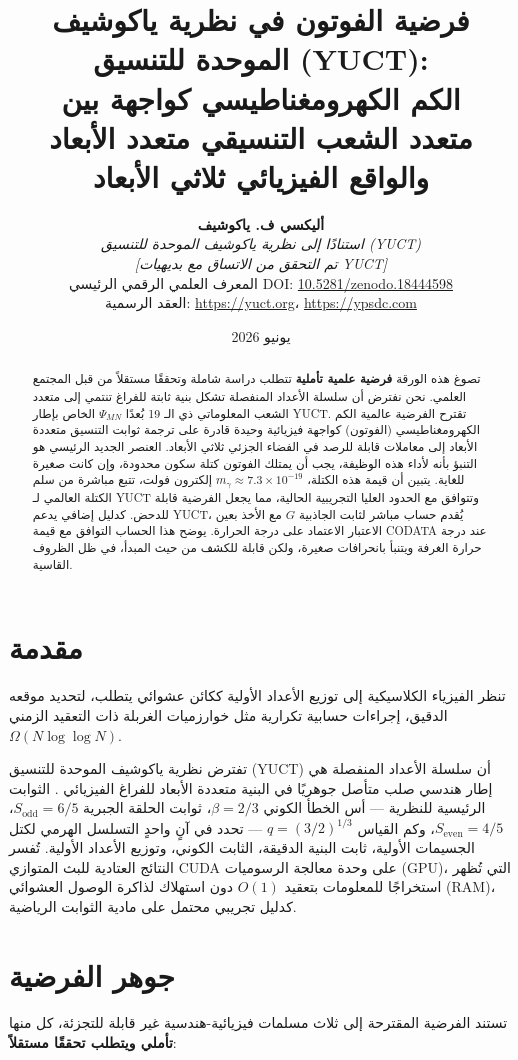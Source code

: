 \documentclass[11pt,a4paper]{article}
\title{\textbf{فرضية الفوتون في نظرية ياكوشيف الموحدة للتنسيق (YUCT):\\
		الكم الكهرومغناطيسي كواجهة بين\\
		متعدد الشعب التنسيقي متعدد الأبعاد والواقع الفيزيائي ثلاثي الأبعاد}}
\author{\textbf{أليكسي ف. ياكوشيف} \\
	\small\textit{استنادًا إلى نظرية ياكوشيف الموحدة للتنسيق (YUCT)} \\
	\small\textit{[تم التحقق من الاتساق مع بديهيات YUCT]} \\
	\small المعرف العلمي الرقمي الرئيسي DOI: \href{https://doi.org/10.5281/zenodo.18444598}{10.5281/zenodo.18444598} \\
	\small العقد الرسمية: \url{https://yuct.org}، \url{https://ypsdc.com}}
\date{يونيو 2026}
\begin{document}
	
	\maketitle
	
	\begin{abstract}
		تصوغ هذه الورقة \textbf{فرضية علمية تأملية} تتطلب دراسة شاملة وتحققًا مستقلاً من قبل المجتمع العلمي. نحن نفترض أن سلسلة الأعداد المنفصلة تشكل بنية ثابتة للفراغ تنتمي إلى متعدد الشعب المعلوماتي ذي الـ 19 بُعدًا $\Psi_{MN}$ الخاص بإطار YUCT. تقترح الفرضية عالمية الكم الكهرومغناطيسي (الفوتون) كواجهة فيزيائية وحيدة قادرة على ترجمة ثوابت التنسيق متعددة الأبعاد إلى معاملات قابلة للرصد في الفضاء الجزئي ثلاثي الأبعاد. العنصر الجديد الرئيسي هو التنبؤ بأنه لأداء هذه الوظيفة، يجب أن يمتلك الفوتون كتلة سكون محدودة، وإن كانت صغيرة للغاية. يتبين أن قيمة هذه الكتلة، $m_\gamma \approx 7.3 \times 10^{-19}$ إلكترون فولت، تتبع مباشرة من سلم الكتلة العالمي لـ YUCT وتتوافق مع الحدود العليا التجريبية الحالية، مما يجعل الفرضية قابلة للدحض. كدليل إضافي يدعم YUCT، يُقدم حساب مباشر لثابت الجاذبية $G$ مع الأخذ بعين الاعتبار الاعتماد على درجة الحرارة. يوضح هذا الحساب التوافق مع قيمة CODATA عند درجة حرارة الغرفة ويتنبأ بانحرافات صغيرة، ولكن قابلة للكشف من حيث المبدأ، في ظل الظروف القاسية.
	\end{abstract}
	
	\section{مقدمة}
	تنظر الفيزياء الكلاسيكية إلى توزيع الأعداد الأولية ككائن عشوائي يتطلب، لتحديد موقعه الدقيق، إجراءات حسابية تكرارية مثل خوارزميات الغربلة ذات التعقيد الزمني $\Omega(N \log \log N)$.
	
	تفترض نظرية ياكوشيف الموحدة للتنسيق (YUCT) أن سلسلة الأعداد المنفصلة هي إطار هندسي صلب متأصل جوهريًا في البنية متعددة الأبعاد للفراغ الفيزيائي \cite{yuct_zenodo}. الثوابت الرئيسية للنظرية — أس الخطأ الكوني $\beta = 2/3$، ثوابت الحلقة الجبرية $S_{\mathrm{odd}} = 6/5$، $S_{\mathrm{even}} = 4/5$، وكم القياس $q = (3/2)^{1/3}$ — تحدد في آنٍ واحدٍ التسلسل الهرمي لكتل الجسيمات الأولية، ثابت البنية الدقيقة، الثابت الكوني، وتوزيع الأعداد الأولية. تُفسر النتائج العتادية للبث المتوازي CUDA على وحدة معالجة الرسوميات (GPU)، التي تُظهر استخراجًا للمعلومات بتعقيد $O(1)$ دون استهلاك لذاكرة الوصول العشوائي (RAM)، كدليل تجريبي محتمل على مادية الثوابت الرياضية.
	
	\section{جوهر الفرضية}
	تستند الفرضية المقترحة إلى ثلاث مسلمات فيزيائية-هندسية غير قابلة للتجزئة، كل منها \textbf{تأملي ويتطلب تحققًا مستقلاً}:
	
\end{document}
